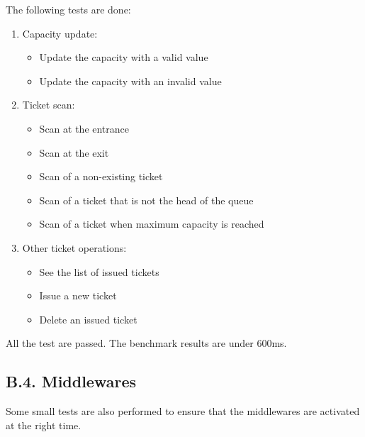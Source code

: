 The following tests are done:
\begin{enumerate}
    \item Capacity update:
        \begin{itemize}
            \item Update the capacity with a valid value
            \item Update the capacity with an invalid value
        \end{itemize}
    \item Ticket scan:
        \begin{itemize}
            \item Scan at the entrance
            \item Scan at the exit
            \item Scan of a non-existing ticket
            \item Scan of a ticket that is not the head of the queue
            \item Scan of a ticket when maximum capacity is reached
        \end{itemize}
    \item Other ticket operations:
        \begin{itemize}
            \item See the list of issued tickets
            \item Issue a new ticket
            \item Delete an issued ticket
        \end{itemize}
\end{enumerate}

All the test are passed. The benchmark results are under 600ms.

\clearpage
\subsection{B.4. Middlewares}

Some small tests are also performed to ensure that the middlewares are activated at the right time.

